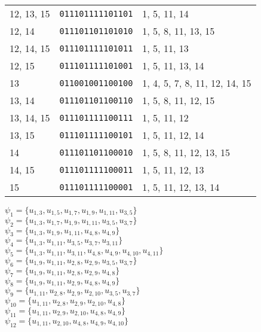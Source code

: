 \documentclass[a4paper,12pt]{article}
\begin{document}
\begin{longtable}{l|l|l}
        12, 13, 15&\texttt{011101111101101}&1, 5, 11, 14\\
        12, 14&\texttt{011101101101010}&1, 5, 8, 11, 13, 15\\
        12, 14, 15&\texttt{011101111101011}&1, 5, 11, 13\\
        12, 15&\texttt{011101111101001}&1, 5, 11, 13, 14\\
        13&\texttt{011001001100100}&1, 4, 5, 7, 8, 11, 12, 14, 15\\
        13, 14&\texttt{011101101100110}&1, 5, 8, 11, 12, 15\\
        13, 14, 15&\texttt{011101111100111}&1, 5, 11, 12\\
        13, 15&\texttt{011101111100101}&1, 5, 11, 12, 14\\
        14&\texttt{011101101100010}&1, 5, 8, 11, 12, 13, 15\\
        14, 15&\texttt{011101111100011}&1, 5, 11, 12, 13\\
        15&\texttt{011101111100001}&1, 5, 11, 12, 13, 14\\
    \end{longtable}

    \noindent
    $\psi_{1}=\{u_{1,3},u_{1,5},u_{1,7},u_{1,9},u_{1,11},u_{3,5}\}$\\
    $\psi_{2}=\{u_{1,3},u_{1,7},u_{1,9},u_{1,11},u_{3,5},u_{3,7}\}$\\
    $\psi_{3}=\{u_{1,3},u_{1,9},u_{1,11},u_{4,8},u_{4,9}\}$\\
    $\psi_{4}=\{u_{1,3},u_{1,11},u_{3,5},u_{3,7},u_{3,11}\}$\\
    $\psi_{5}=\{u_{1,3},u_{1,11},u_{3,11},u_{4,8},u_{4,9},u_{4,10},u_{4,11}\}$\\
    $\psi_{6}=\{u_{1,9},u_{1,11},u_{2,8},u_{2,9},u_{3,5},u_{3,7}\}$\\
    $\psi_{7}=\{u_{1,9},u_{1,11},u_{2,8},u_{2,9},u_{4,8}\}$\\
    $\psi_{8}=\{u_{1,9},u_{1,11},u_{2,9},u_{4,8},u_{4,9}\}$\\
    $\psi_{9}=\{u_{1,11},u_{2,8},u_{2,9},u_{2,10},u_{3,5},u_{3,7}\}$\\
    $\psi_{10}=\{u_{1,11},u_{2,8},u_{2,9},u_{2,10},u_{4,8}\}$\\
    $\psi_{11}=\{u_{1,11},u_{2,9},u_{2,10},u_{4,8},u_{4,9}\}$\\
    $\psi_{12}=\{u_{1,11},u_{2,10},u_{4,8},u_{4,9},u_{4,10}\}$\\
\end{document}
